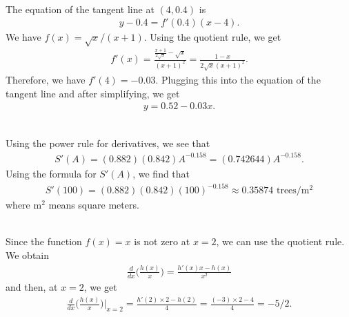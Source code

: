 	\spc
	
	\\
	The equation of the tangent line at $(4, 0.4)$ is
		\begin{align*}
		y - 0.4 = f'(0.4) (x - 4) .
		\end{align*}
	We have $f(x) = \sqrt{x}/(x + 1)$. Using the quotient rule, we get
		\begin{align*}
		f'(x) = \frac{\frac{x + 1}{2\sqrt{x}} - \sqrt{x}}{(x + 1)^2} = \frac{1 - x}{2\sqrt{x}(x + 1)^2} .
		\end{align*}
	Therefore, we have $f'(4) = -0.03$. Plugging this into the equation of the tangent line and after simplifying, we get
		\begin{align*}
		y = 0.52 - 0.03x .
		\end{align*}
		
	\spc
	
	\\
	Using the power rule for derivatives, we see that
		\begin{align*}
		S'(A) = (0.882)(0.842)A^{-0.158} = (0.742644)A^{-0.158}.
		\end{align*}
	Using the formula for $S'(A)$, we find that
		\begin{align*}
		S'(100) = (0.882)(0.842)(100)^{-0.158} \approx 0.35874 \text{ trees}/\text{m}^2
		\end{align*}
	where $\text{m}^2$ means square meters.
	
	\newpage
	
	\\
	Since the function $f(x) = x$ is not zero at $x = 2$, we can use the quotient rule. We obtain
		\begin{align*}
		\frac{d}{dx} \Big( \frac{h(x)}{x} \Big) = \frac{h'(x) x - h(x)}{x^2} 
		\end{align*}
	and then, at $x = 2$, we get
		\begin{align*}
		\frac{d}{dx} \Big( \frac{h(x)}{x} \Big) \Big|_{x = 2} = \frac{h'(2) \times 2 - h(2)}{4} = \frac{(-3) \times 2 - 4}{4} = -5/2 .
		\end{align*}
	
	
